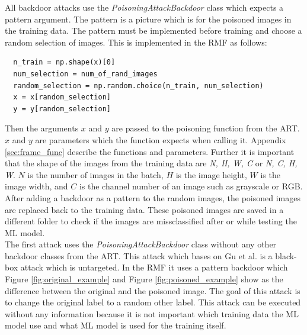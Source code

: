 All backdoor attacks use the \textit{PoisoningAttackBackdoor} class which expects a pattern argument. The pattern is a picture which is for the poisoned images in the training data. The pattern must be implemented before training and choose a random selection of images. This is implemented in the RMF as follows:

\begin{lstlisting}
  n_train = np.shape(x)[0]
  num_selection = num_of_rand_images
  random_selection = np.random.choice(n_train, num_selection)
  x = x[random_selection]
  y = y[random_selection]
\end{lstlisting}

Then the arguments $x$ and $y$ are passed to the poisoning function from the ART. $x$ and $y$ are parameters which the function expects when calling it. Appendix \ref{sec:frame_func} describe the functions and parameters. Further it is important that the shape of the images from the training data are \textit{N, H, W, C} or \textit{N, C, H, W}. $N$ is the number of images in the batch, $H$ is the image height, $W$ is the image width, and $C$ is the channel number of an image such as grayscale or RGB. After adding a backdoor as a pattern to the random images, the poisoned images are replaced back to the training data. These poisoned images are saved in a different folder to check if the images are missclassified after or while testing the ML model.\\

The first attack uses the \textit{PoisoningAttackBackdoor} class without any other backdoor classes from the ART. This attack which bases on Gu et al. \cite{DBLP:journals/corr/abs-1708-06733} is a black-box attack which is untargeted. In the RMF it uses a pattern backdoor which Figure \ref{fig:original_example} and Figure \ref{fig:poisoned_example} show as the difference between the original and the poisoned image. The goal of this attack is to change the original label to a random other label. This attack can be executed without any information because it is not important which training data the ML model use and what ML model is used for the training itself.

